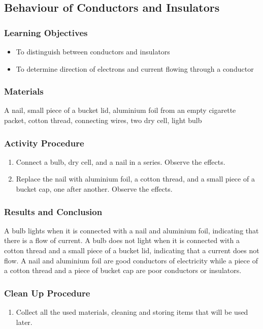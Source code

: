 \subsection{Behaviour of Conductors and Insulators} 

\subsubsection*{Learning Objectives}
\begin{itemize}
\item{To distinguish between conductors and insulators} 
\item{To determine direction of electrons and current flowing through a conductor} 
\end{itemize}


\subsubsection*{Materials}
A nail, small piece of a bucket lid, aluminium foil from an empty cigarette packet, cotton thread, connecting wires, two dry cell, light bulb

\subsubsection*{Activity Procedure}
\begin{enumerate}
\item{Connect a bulb, dry cell, and a nail in a series.  Observe the effects.} 
\item{Replace the nail  with aluminium foil, a cotton thread, and a small piece of a bucket cap, one after another.  Observe the effects.} 
\end{enumerate}

\subsubsection*{Results and Conclusion}
A bulb lights when it is connected with a nail and aluminium foil, indicating that there is a flow of current. A bulb does not light when it is connected with a cotton thread  and a small piece of a bucket lid, indicating that a current does not flow. A nail and aluminium foil are good conductors of electricity while a piece of a cotton thread and a piece of bucket cap are poor conductors or insulators.

\subsubsection*{Clean Up Procedure}
\begin{enumerate}
\item{Collect all the used materials, cleaning and storing items that will be used later.} 
\end{enumerate}

